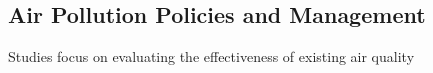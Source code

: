 \documentclass[12pt]{article}
\begin{document}
\subsection{Air Pollution Policies and Management}
Studies focus on evaluating the effectiveness of existing air quality






\newpage

\printbibliography
\end{document}
